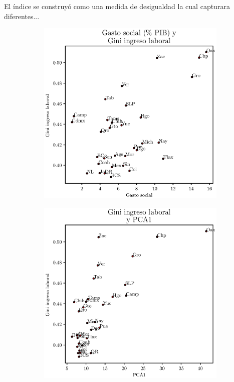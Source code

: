 \documentclass[11pt]{article}
\begin{document}
El índice se construyó como una medida de desigualdad la cual capturara diferentes...
%
\begin{figure}[H]
\caption{Gasto social e índice de Gini del ingreso laboral}
\begin{subfigure}{.5\textwidth}
  \centering
  \includegraphics[width=.95\linewidth]{Graphs_tables_maps/Gs_Gini_ingreso_laboral.eps}
\end{subfigure}%
\begin{subfigure}{.5\textwidth}
  \centering
  \includegraphics[width=.95\linewidth]{Graphs_tables_maps/pca_Gini_ingreso_laboral.eps}

\end{subfigure}
\end{figure}
\end{document}
